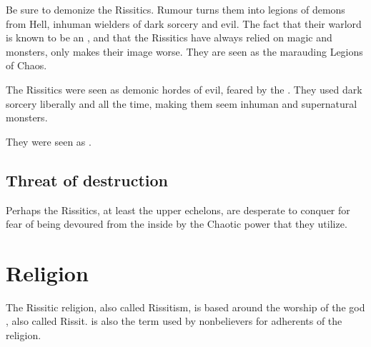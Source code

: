 
Be sure to demonize the Rissitics. 
Rumour turns them into legions of demons from Hell, inhuman wielders of dark sorcery and evil.
The fact that their warlord \Narkiza is known to be an \Ashenoch, and that the Rissitics have always relied on magic and monsters, only makes their image worse.
They are seen as the marauding Legions of Chaos.

The Rissitics were seen as demonic hordes of evil, feared by the \Velcadians.
They used dark sorcery liberally and all the time, making them seem inhuman and supernatural monsters.

They were seen as .





\subsection{Threat of destruction}
Perhaps the Rissitics, at least the upper echelons, are desperate to conquer for fear of being devoured from the inside by the Chaotic power that they utilize. 

















\section{Religion}
The Rissitic religion, also called Rissitism, is based around the worship of the god \HriistN, also called Rissit. 
 is also the term used by nonbelievers for adherents of the religion. 









